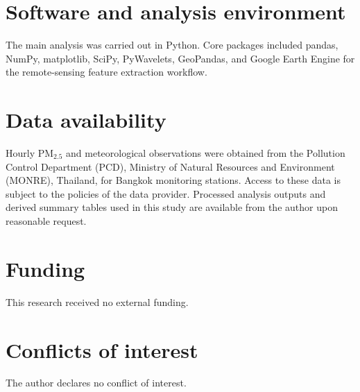 \documentclass[12pt,a4paper]{article}
\begin{document}
\vspace{1.5em}







\section*{Software and analysis environment}
The main analysis was carried out in Python. Core packages included pandas, NumPy, matplotlib, SciPy, PyWavelets, GeoPandas, and Google Earth Engine for the remote-sensing feature extraction workflow.

\section*{Data availability}
Hourly PM$_{2.5}$ and meteorological observations were obtained from the Pollution Control Department (PCD), Ministry of Natural Resources and Environment (MONRE), Thailand, for Bangkok monitoring stations. Access to these data is subject to the policies of the data provider. Processed analysis outputs and derived summary tables used in this study are available from the author upon reasonable request.

\section*{Funding}
This research received no external funding.

\section*{Conflicts of interest}
The author declares no conflict of interest.



\end{document}
